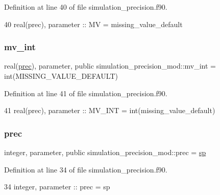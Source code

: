 Definition at line 40 of file simulation\+\_\+precision.\+f90.


\begin{DoxyCode}
40     \textcolor{keywordtype}{real(prec)}, \textcolor{keywordtype}{parameter} :: MV     = missing\_value\_default
\end{DoxyCode}
\mbox{\label{namespacesimulation__precision__mod_abcad51274c804cb573d8f5720c5dfa05}} 
\subsubsection{\texorpdfstring{mv\+\_\+int}{mv\_int}}
{\footnotesize\ttfamily real(\mbox{\hyperlink{namespacesimulation__precision__mod_aaff1ddf996761a1e11e787d63e1612f6}{prec}}), parameter, public simulation\+\_\+precision\+\_\+mod\+::mv\+\_\+int = int(M\+I\+S\+S\+I\+N\+G\+\_\+\+V\+A\+L\+U\+E\+\_\+\+D\+E\+F\+A\+U\+LT)}



Definition at line 41 of file simulation\+\_\+precision.\+f90.


\begin{DoxyCode}
41     \textcolor{keywordtype}{real(prec)}, \textcolor{keywordtype}{parameter} :: MV\_INT = int(missing\_value\_default)
\end{DoxyCode}
\mbox{\label{namespacesimulation__precision__mod_aaff1ddf996761a1e11e787d63e1612f6}} 
\subsubsection{\texorpdfstring{prec}{prec}}
{\footnotesize\ttfamily integer, parameter, public simulation\+\_\+precision\+\_\+mod\+::prec = \mbox{\hyperlink{namespacesimulation__precision__mod_a15b1ab993f9b11430e9d9d3dc6c77614}{sp}}}



Definition at line 34 of file simulation\+\_\+precision.\+f90.


\begin{DoxyCode}
34     \textcolor{keywordtype}{integer},  \textcolor{keywordtype}{parameter} :: prec      = sp
\end{DoxyCode}
\mbox{\label{namespacesimulation__precision__mod_a3833ad1bc52c3738ac861591b7492737}} 
